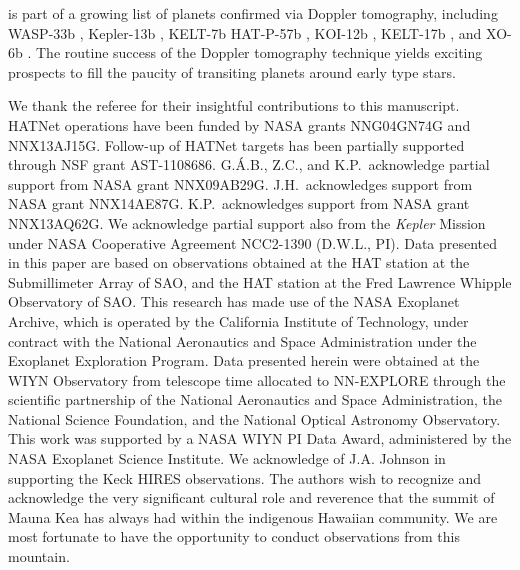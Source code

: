 \documentclass[apjl]{emulateapj}
\begin{document}
\hatcurb{} is part of a growing list of planets confirmed via Doppler tomography, including WASP-33b \citep{Collier:2010b,Johnson:2015}, Kepler-13b \citep{Johnson:2014}, KELT-7b \citep{Bieryla:2015,Zhou:2016} HAT-P-57b \citep{Hartman:2015}, KOI-12b \citep{Bourrier:2015}, KELT-17b \citep{2016arXiv160703512Z}, and XO-6b \citep{2016arXiv161202776C}. The routine success of the Doppler tomography technique yields exciting prospects to fill the paucity of transiting planets around early type stars.




\acknowledgements  

We thank the referee for their insightful contributions to this manuscript. HATNet operations have been
funded by NASA grants NNG04GN74G and NNX13AJ15G. Follow-up of HATNet
targets has been partially supported through NSF grant
AST-1108686. G.\'A.B., Z.C., and K.P.\ acknowledge partial support
from NASA grant NNX09AB29G. J.H.\ acknowledges support from NASA grant
NNX14AE87G. K.P.\ acknowledges support from NASA grant NNX13AQ62G. We
acknowledge partial support also from the {\em Kepler} Mission under
NASA Cooperative Agreement NCC2-1390 (D.W.L., PI). Data presented in this paper are
based on observations obtained at the HAT station at the Submillimeter
Array of SAO, and the HAT station at the Fred Lawrence Whipple
Observatory of SAO. This research has made use of the NASA Exoplanet
Archive, which is operated by the California Institute of Technology,
under contract with the National Aeronautics and Space Administration
under the Exoplanet Exploration Program. Data presented herein were
obtained at the WIYN Observatory from telescope time allocated to
NN-EXPLORE through the scientific partnership of the National
Aeronautics and Space Administration, the National Science Foundation,
and the National Optical Astronomy Observatory. This work was
supported by a NASA WIYN PI Data Award, administered by the NASA
Exoplanet Science Institute. We acknowledge of J.A. Johnson in supporting the Keck HIRES observations. The authors wish to recognize and
acknowledge the very significant cultural role and reverence that the
summit of Mauna Kea has always had within the indigenous Hawaiian
community. We are most fortunate to have the opportunity to conduct
observations from this mountain.

%


\end{document}
